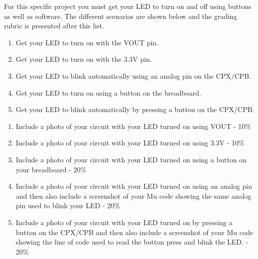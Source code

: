 For this specific project you must get your LED to turn on and off using buttons as well as software. The different scenarios are shown below and the grading rubric is presented after this list.
\begin{enumerate}[itemsep=-5pt]
\item Get your LED to turn on with the VOUT pin.
\item Get your LED to turn on with the 3.3V pin.
\item Get your LED to blink automatically using an analog pin on the CPX/CPB.
\item Get your LED to turn on using a button on the breadboard.
\item Get your LED to blink automatically by pressing a button on the CPX/CPB.
\end{enumerate}



\begin{enumerate}[itemsep=-5pt]
\item Include a photo of your circuit with your LED turned on using VOUT - 10\%
\item Include a photo of your circuit with your LED turned on using 3.3V - 10\%
\item Include a photo of your circuit with your LED turned on using a button on your breadboard - 20\%
\item Include a photo of your circuit with your LED turned on using an analog pin and then also include a screenshot of your Mu code showing the same analog pin used to blink your LED - 20\%
\item Include a photo of your circuit with your LED turned on by pressing a button on the CPX/CPB and then also include a screenshot of your Mu code showing the line of code used to read the button press and blink the LED. - 20\%
\end{enumerate}
